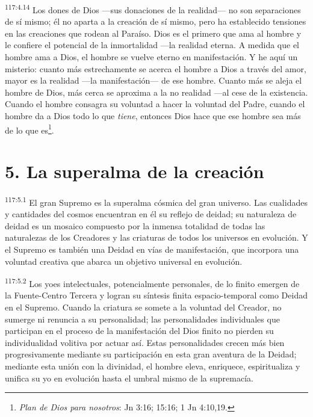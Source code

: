 \documentclass[twoside, 11pt]{book}
\begin{document}
\par
\textsuperscript{117:4.14} Los dones de Dios ---sus donaciones de la realidad--- no son separaciones de sí mismo; él no aparta a la creación de sí mismo, pero ha establecido tensiones en las creaciones que rodean al Paraíso. Dios es el primero que ama al hombre y le confiere el potencial de la inmortalidad ---la realidad eterna. A medida que el hombre ama a Dios, el hombre se vuelve eterno en manifestación. Y he aquí un misterio: cuanto más estrechamente se acerca el hombre a Dios a través del amor, mayor es la realidad ---la manifestación--- de ese hombre. Cuanto más se aleja el hombre de Dios, más cerca se aproxima a la no realidad ---al cese de la existencia. Cuando el hombre consagra su voluntad a hacer la voluntad del Padre, cuando el hombre da a Dios todo lo que \textit{tiene}, entonces Dios hace que ese hombre sea más de lo que es\footnote{\textit{Plan de Dios para nosotros}: Jn 3:16; 15:16; 1 Jn 4:10,19.}.

\section*{5. La superalma de la creación}
\par
\textsuperscript{117:5.1} El gran Supremo es la superalma cósmica del gran universo. Las cualidades y cantidades del cosmos encuentran en él su reflejo de deidad; su naturaleza de deidad es un mosaico compuesto por la inmensa totalidad de todas las naturalezas de los Creadores y las criaturas de todos los universos en evolución. Y el Supremo es también una Deidad en vías de manifestación, que incorpora una voluntad creativa que abarca un objetivo universal en evolución.

\par
\textsuperscript{117:5.2} Los yoes intelectuales, potencialmente personales, de lo finito emergen de la Fuente-Centro Tercera y logran su síntesis finita espacio-temporal como Deidad en el Supremo. Cuando la criatura se somete a la voluntad del Creador, no sumerge ni renuncia a su personalidad; las personalidades individuales que participan en el proceso de la manifestación del Dios finito no pierden su individualidad volitiva por actuar así. Estas personalidades crecen más bien progresivamente mediante su participación en esta gran aventura de la Deidad; mediante esta unión con la divinidad, el hombre eleva, enriquece, espiritualiza y unifica su yo en evolución hasta el umbral mismo de la supremacía.
\end{document}
